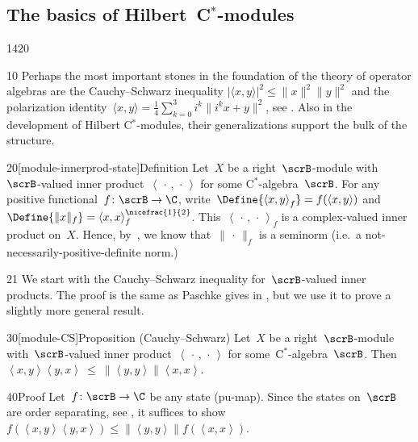 \subsection{The basics of Hilbert~C$^*$-modules}
\begin{parsec}{1420}%
\begin{point}{10}%
    Perhaps the most important stones in the foundation
        of the theory of operator algebras
        are the Cauchy--Schwarz inequality
        $| \langle x,y\rangle|^2 \leq \|x\|^2\|y\|^2$
        and the polarization
        identity~$\langle x,y\rangle = \frac{1}{4} \sum_{k=0}^3 i^k \|i^k x+ y\|^2$,
        see .
    Also in the development of Hilbert C$^*$-modules,
        their generalizations support the bulk of the structure.
\end{point}
\begin{point}{20}[module-innerprod-state]{Definition}%
Let~$X$ be a right~$\scrB$-module with~$\scrB$-valued inner
    product~$\left<\,\cdot\,,\,\cdot\,\right>$ for some
    C$^*$-algebra~$\scrB$.
For any positive functional~$f\colon \scrB \to \C$,
write~$\Define{\left<x,y\right>_f} = f(\left<x,y\right>)$
and~$\Define{\|x\|_f} = \smash{ \langle x,x\rangle^{\nicefrac{1}{2}}_f}$.
This~$\left<\,\cdot\,,\,\cdot\,\right>_f$
    is a complex-valued inner product on~$X$.
Hence, by~,
    we know that~$\|\,\cdot\,\|_f$ is a seminorm
        (i.e.~a not-necessarily-positive-definite norm.)
\begin{point}{21}%
We start with the Cauchy--Schwarz inequality
    for~$\scrB$-valued inner products.
The proof is the same as Paschke gives
        in \cite[prop.~2.3 (ii)]{paschke},
        but we use it to prove a slightly more general result.
\end{point}
\end{point}
\begin{point}{30}[module-CS]{Proposition (Cauchy--Schwarz)}%
Let~$X$ be a right~$\scrB$-module
    with~$\scrB$-valued inner product~$\left<\,\cdot\,,\,\cdot\,\right>$
    for some~C$^*$-algebra~$\scrB$.
Then~$\left<x,y\right>\left<y,x\right> \ \leq\  \|\left<y,y\right>\| \left<x,x\right>$.
\begin{point}{40}{Proof}%
Let~$f\colon \scrB \to \C$ be any state (pu-map).
Since the states on~$\scrB$ are order separating,
see ,
it suffices to show~$f(\left<x,y\right>\left<y,x\right>)
\leq \|\left<y,y\right>\| f(\left<x,x\right>)$.

\end{point}
\end{point}
\end{parsec}
